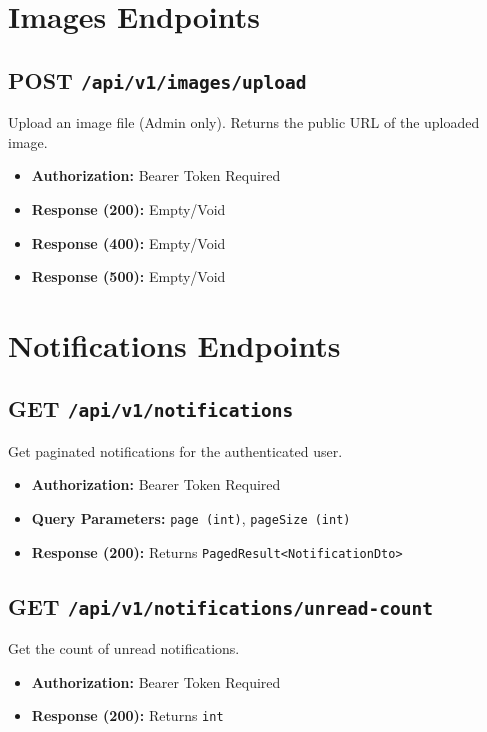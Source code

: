 \section{Images Endpoints}

\subsection{POST \texttt{/api/v1/images/upload}}
Upload an image file (Admin only). Returns the public URL of the uploaded image.
\begin{itemize}
    \item \textbf{Authorization:} Bearer Token Required
    \item \textbf{Response (200):} Empty/Void
    \item \textbf{Response (400):} Empty/Void
    \item \textbf{Response (500):} Empty/Void
\end{itemize}

\section{Notifications Endpoints}

\subsection{GET \texttt{/api/v1/notifications}}
Get paginated notifications for the authenticated user.
\begin{itemize}
    \item \textbf{Authorization:} Bearer Token Required
    \item \textbf{Query Parameters:} \texttt{page (int)}, \texttt{pageSize (int)}
    \item \textbf{Response (200):} Returns \texttt{PagedResult<NotificationDto>}
\end{itemize}

\subsection{GET \texttt{/api/v1/notifications/unread-count}}
Get the count of unread notifications.
\begin{itemize}
    \item \textbf{Authorization:} Bearer Token Required
    \item \textbf{Response (200):} Returns \texttt{int}
\end{itemize}

